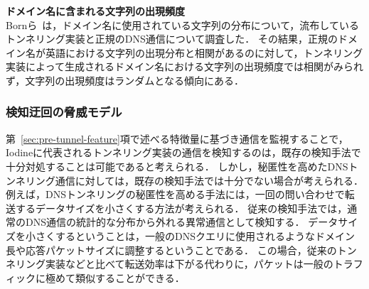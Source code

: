 

\hspace{-12pt}\textbf{ドメイン名に含まれる文字列の出現頻度}\\
\hspace{12pt}Bornら~\cite{born}は，ドメイン名に使用されている文字列の分布について，流布しているトンネリング実装と正規のDNS通信について調査した．
その結果，正規のドメイン名が英語における文字列の出現分布と相関があるのに対して，トンネリング実装によって生成されるドメイン名における文字列の出現頻度では相関がみられず，文字列の出現頻度はランダムとなる傾向にある．



\subsubsection{検知迂回の脅威モデル}
\label{sec:bypass-method}
第~\ref{sec:pre-tunnel-feature}項で述べる特徴量に基づき通信を監視することで，Iodineに代表されるトンネリング実装の通信を検知するのは，既存の検知手法で十分対処することは可能であると考えられる．
しかし，秘匿性を高めたDNSトンネリング通信に対しては，既存の検知手法では十分でない場合が考えられる．
例えば，DNSトンネリングの秘匿性を高める手法には，一回の問い合わせで転送するデータサイズを小さくする方法が考えられる．
従来の検知手法では，通常のDNS通信の統計的な分布から外れる異常通信として検知する．
データサイズを小さくするということは，一般のDNSクエリに使用されるようなドメイン長や応答パケットサイズに調整するということである．
この場合，従来のトンネリング実装などと比べて転送効率は下がる代わりに，パケットは一般のトラフィックに極めて類似することができる．

